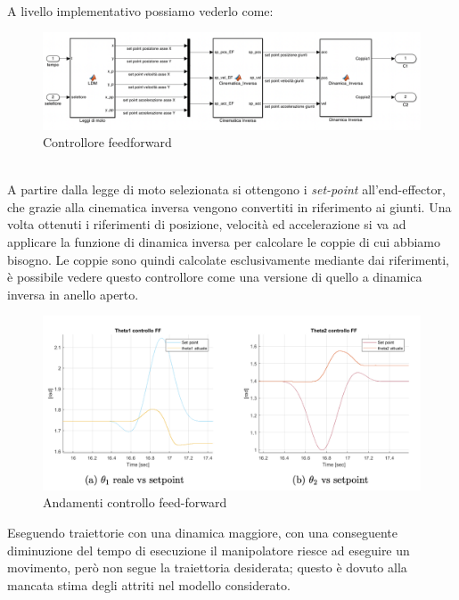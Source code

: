 \\A livello implementativo possiamo vederlo come:
\begin{figure}[ht]
	\begin{center}
		\includegraphics[scale=0.35]{Immagini/Controllori/feedForward}
		\caption{Controllore feedforward}
		\label{fig:FF}
	\end{center}
\end{figure}
\\A partire dalla legge di moto selezionata si ottengono i \textit{set-point} all'end-effector, che grazie alla cinematica inversa vengono convertiti in riferimento ai giunti.  Una volta ottenuti i riferimenti di posizione, velocità ed accelerazione si va ad applicare la funzione di dinamica inversa per calcolare le coppie di cui abbiamo bisogno. Le coppie sono quindi calcolate esclusivamente mediante dai riferimenti, è possibile vedere questo controllore come una versione di quello a dinamica inversa in anello aperto.
\begin{figure}[ht]
	\begin{center}
		\includegraphics[scale=0.45]{Immagini/Traiettorie/fftot}
\caption{Andamenti controllo feed-forward}
		\label{fig:ffcoppie}
	\end{center}
\end{figure}
Eseguendo traiettorie con una dinamica maggiore, con una conseguente diminuzione del tempo di esecuzione il manipolatore riesce ad eseguire un movimento, però non segue la traiettoria desiderata; questo è dovuto alla mancata stima degli attriti nel modello considerato.
